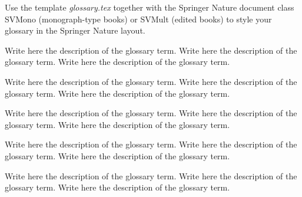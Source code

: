 %
%


Use the template \emph{glossary.tex} together with the Springer Nature document class SVMono (monograph-type books) or SVMult (edited books) to style your glossary in the Springer Nature layout.

 Write here the description of the glossary term. Write here the description of the glossary term. Write here the description of the glossary term.

 Write here the description of the glossary term. Write here the description of the glossary term. Write here the description of the glossary term.

 Write here the description of the glossary term. Write here the description of the glossary term. Write here the description of the glossary term.

 Write here the description of the glossary term. Write here the description of the glossary term. Write here the description of the glossary term.

 Write here the description of the glossary term. Write here the description of the glossary term. Write here the description of the glossary term.